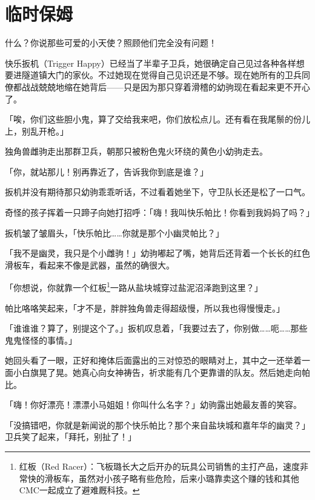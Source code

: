 \chapter{临时保姆}



\begin{intro}
    什么？你说那些可爱的小天使？照顾他们完全没有问题！
\end{intro}


快乐扳机（Trigger Happy）已经当了半辈子卫兵，她很确定自己见过各种各样想要进隧道镇大门的家伙。不过她现在觉得自己见识还是不够。现在她所有的卫兵同僚都战战兢兢地缩在她背后——只是因为那只穿着滑稽的幼驹现在看起来更不开心了。

「唉，你们这些胆小鬼，算了交给我来吧，你们放松点儿。还有看在我尾鬃的份儿上，别乱开枪。」

独角兽雌驹走出那群卫兵，朝那只被粉色鬼火环绕的黄色小幼驹走去。

「你，就站那儿！别再靠近了，告诉我你到底是谁？」

扳机并没有期待那只幼驹乖乖听话，不过看着她坐下，守卫队长还是松了一口气。

奇怪的孩子挥着一只蹄子向她打招呼：「嗨！我叫快乐帕比！你看到我妈妈了吗？」

扳机皱了皱眉头，「快乐帕比……你就是那个小幽灵帕比？」

「我不是幽灵，我只是个小雌驹！」幼驹嘟起了嘴，她背后还背着一个长长的红色滑板车，看起来不像是武器，虽然的确很大。

「你想说，你就靠一个红板\footnote{红板（Red Racer）：飞板璐长大之后开办的玩具公司销售的主打产品，速度非常快的滑板车，虽然对小孩子略有些危险，后来小璐靠卖这个赚的钱和其他CMC一起成立了避难厩科技。}一路从盐块城穿过盐泥沼泽跑到这里？」

帕比咯咯笑起来，「才不是，胖胖独角兽走得超级慢，所以我也得慢慢走。」

「谁谁谁？算了，别提这个了。」扳机叹息着，「我要过去了，你别做……呃……那些鬼鬼怪怪的事情。」

她回头看了一眼，正好和掩体后面露出的三对惊恐的眼睛对上，其中之一还举着一面小白旗晃了晃。她真心向女神祷告，祈求能有几个更靠谱的队友。然后她走向帕比。

「嗨！你好漂亮！漂漂小马姐姐！你叫什么名字？」幼驹露出她最友善的笑容。

「没搞错吧，你就是新闻说的那个快乐帕比？那个来自盐块城和嘉年华的幽灵？」卫兵笑了起来，「拜托，别扯了！」

